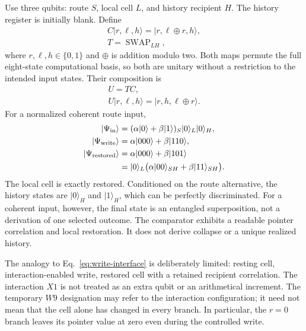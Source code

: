 Use three qubits: route $S$, local cell $L$, and history recipient $H$.
The history register is initially blank. Define
\begin{equation}
\begin{gathered}
C|r,\ell,h\rangle=|r,\ell\mathbin{\oplus}r,h\rangle,
 \\
 T=\operatorname{SWAP}_{LH},
\end{gathered}
\end{equation}
where $r,\ell,h\in\{0,1\}$ and $\oplus$ is addition modulo two.
Both maps permute the full eight-state computational basis, so both
are unitary without a restriction to the intended input states.
Their composition is
\begin{equation}
\begin{gathered}
U=TC,\\
 U|r,\ell,h\rangle
     =|r,h,\ell\mathbin{\oplus}r\rangle.
\end{gathered}
\label{eq:three-register-unitary}
\end{equation}
For a normalized coherent route input,
\begin{align}
 |\Psi_{\rm in}\rangle
  &=(\alpha|0\rangle+\beta|1\rangle)_S|0\rangle_L|0\rangle_H,
  \nonumber\\
 |\Psi_{\rm write}\rangle
  &=\alpha|000\rangle+\beta|110\rangle,
  \label{eq:write-stage}\\
 |\Psi_{\rm restored}\rangle
  &=\alpha|000\rangle+\beta|101\rangle
  \nonumber\\
  &=|0\rangle_L\bigl(\alpha|00\rangle_{SH}
                        +\beta|11\rangle_{SH}\bigr).
 \label{eq:restored-stage}
\end{align}
The local cell is exactly restored. Conditioned on the route alternative,
the history states are $|0\rangle_H$ and $|1\rangle_H$, which can be
perfectly discriminated. For a coherent input, however, the final state
is an entangled superposition, not a derivation of one selected outcome.
The comparator exhibits a readable pointer correlation and local
restoration. It does not derive collapse or a unique realized history.

The analogy to Eq.~\eqref{eq:write-interface} is deliberately limited:
resting cell, interaction-enabled write, restored cell with a retained
recipient correlation. The interaction $X1$ is not treated as an extra
qubit or an arithmetical increment. The temporary $W9$ designation may
refer to the interaction configuration; it need not mean that the cell
alone has changed in every branch. In particular, the $r=0$ branch leaves
its pointer value at zero even during the controlled write.

